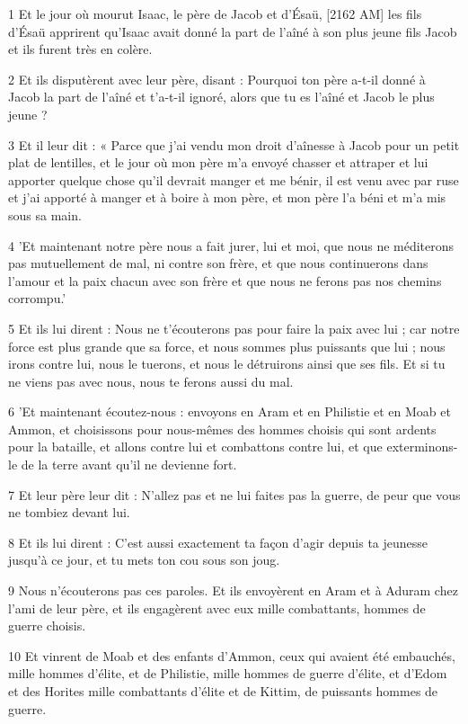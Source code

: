 \par 1 Et le jour où mourut Isaac, le père de Jacob et d'Ésaü, [2162 AM] les fils d'Ésaü apprirent qu'Isaac avait donné la part de l'aîné à son plus jeune fils Jacob et ils furent très en colère.
\par 2 Et ils disputèrent avec leur père, disant : Pourquoi ton père a-t-il donné à Jacob la part de l'aîné et t'a-t-il ignoré, alors que tu es l'aîné et Jacob le plus jeune ?
\par 3 Et il leur dit : « Parce que j'ai vendu mon droit d'aînesse à Jacob pour un petit plat de lentilles, et le jour où mon père m'a envoyé chasser et attraper et lui apporter quelque chose qu'il devrait manger et me bénir, il est venu avec par ruse et j'ai apporté à manger et à boire à mon père, et mon père l'a béni et m'a mis sous sa main.
\par 4 'Et maintenant notre père nous a fait jurer, lui et moi, que nous ne méditerons pas mutuellement de mal, ni contre son frère, et que nous continuerons dans l'amour et la paix chacun avec son frère et que nous ne ferons pas nos chemins corrompu.'
\par 5 Et ils lui dirent : Nous ne t'écouterons pas pour faire la paix avec lui ; car notre force est plus grande que sa force, et nous sommes plus puissants que lui ; nous irons contre lui, nous le tuerons, et nous le détruirons ainsi que ses fils. Et si tu ne viens pas avec nous, nous te ferons aussi du mal.
\par 6 'Et maintenant écoutez-nous : envoyons en Aram et en Philistie et en Moab et Ammon, et choisissons pour nous-mêmes des hommes choisis qui sont ardents pour la bataille, et allons contre lui et combattons contre lui, et que exterminons-le de la terre avant qu'il ne devienne fort.
\par 7 Et leur père leur dit : N'allez pas et ne lui faites pas la guerre, de peur que vous ne tombiez devant lui.
\par 8 Et ils lui dirent : C'est aussi exactement ta façon d'agir depuis ta jeunesse jusqu'à ce jour, et tu mets ton cou sous son joug.
\par 9 Nous n'écouterons pas ces paroles. Et ils envoyèrent en Aram et à Aduram chez l'ami de leur père, et ils engagèrent avec eux mille combattants, hommes de guerre choisis.
\par 10 Et vinrent de Moab et des enfants d'Ammon, ceux qui avaient été embauchés, mille hommes d'élite, et de Philistie, mille hommes de guerre d'élite, et d'Edom et des Horites mille combattants d'élite et de Kittim, de puissants hommes de guerre.
